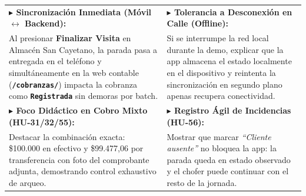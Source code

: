\documentclass[a4paper,9pt]{article}
\newcommand{\codeb}[1]{\texttt{\bfseries #1}}
\begin{document}
\begin{tcolorbox}[cardheader, title={\small Panel Táctico del Presentador: Tips Clave para la App Móvil en Vivo}, top=2pt, bottom=2pt]
{\scriptsize
\begin{tabularx}{\textwidth}{@{}X X@{}}
\textbf{$\blacktriangleright$ Sincronización Inmediata (Móvil $\leftrightarrow$ Backend):} & \textbf{$\blacktriangleright$ Tolerancia a Desconexión en Calle (Offline):} \\
Al presionar \textbf{Finalizar Visita} en Almacén San Cayetano, la parada pasa a entregada en el teléfono y simultáneamente en la web contable (\codeb{/cobranzas/}) impacta la cobranza como \codeb{Registrada} sin demoras por batch. & Si se interrumpe la red local durante la demo, explicar que la app almacena el estado localmente en el dispositivo y reintenta la sincronización en segundo plano apenas recupera conectividad. \\
\midrule
\textbf{$\blacktriangleright$ Foco Didáctico en Cobro Mixto (HU-31/32/55):} & \textbf{$\blacktriangleright$ Registro Ágil de Incidencias (HU-56):} \\
Destacar la combinación exacta: \$100.000 en efectivo y \$99.477,06 por transferencia con foto del comprobante adjunta, demostrando control exhaustivo de arqueo. & Mostrar que marcar \textit{``Cliente ausente''} no bloquea la app: la parada queda en estado observado y el chofer puede continuar con el resto de la jornada. \\
\end{tabularx}
}
\end{tcolorbox}

\newpage

\end{document}
